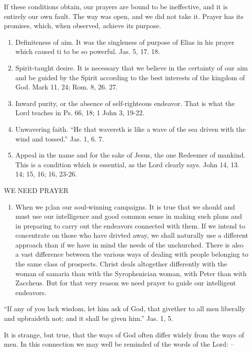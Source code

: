 \documentclass[
]{book}
\providecommand{\tightlist}{%
  \setlength{\itemsep}{0pt}\setlength{\parskip}{0pt}}
\begin{document}
If these conditions obtain, our prayers are bound to be ineffective, and it is entirely our own fault. The way was open, and we did not take it. Prayer has its promises, which, when observed, achieve its purpose.

\begin{enumerate}
\def\labelenumi{\arabic{enumi}.}
\item
  Definiteness of aim. It was the singleness of purpose of Elias in his prayer which caused ti to be so powerful. Jas. 5, 17. 18.
\item
  Spirit-taught desire. It is necessary that we believe in the certainty of our aim and be guided by the Spirit according to the best interests of the kingdom of God. Mark 11, 24; Rom. 8, 26. 27.
\item
  Inward purity, or the absence of self-righteous endeavor. That is what the Lord teaches in Ps. 66, 18; 1 John 3, 19-22.
\item
  Unwavering faith. ``He that wavereth is like a wave of the sea driven with the wind and tossed.'' Jas. 1, 6. 7.
\item
  Appeal in the name and for the sake of Jesus, the one Redeemer of mankind. This is a condition which is essential, as the Lord clearly says. John 14, 13. 14; 15, 16; 16, 23-26.
\end{enumerate}

WE NEED PRAYER

\begin{enumerate}
\def\labelenumi{\alph{enumi}.}
\tightlist
\item
  When we p;lan our soul-winning campaigns. It is true that we should and must use our intelligence and good common sense in making such plans and in preparing to carry out the endeavors connected with them. If we intend to concentrate on those who have drivted away, we shall naturally use a different approach than if we have in mind the needs of the unchurched. There is also a vast difference between the various ways of dealing with people belonging to the same class of prospects. Christ deals altogether differently with the woman of samaria than with the Syrophenician woman, with Peter than with Zaccheus. But for that very reason we need prayer to guide our intelligent endeavors.
\end{enumerate}

``If any of you lack wisdom, let him ask of God, that givether to all men liberally and upbraideth not; and it shall be given him.'' Jas. 1, 5.

It is strange, but true, that the ways of God often differ widely from the ways of men. In this connection we may well be reminded of the words of the Lord: --
\end{document}

